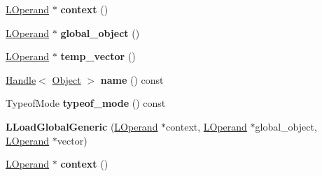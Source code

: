 \begin{DoxyCompactItemize}
\item 
\hyperlink{classv8_1_1internal_1_1_l_operand}{L\+Operand} $\ast$ {\bfseries context} ()\hypertarget{classv8_1_1internal_1_1_l_load_global_generic_acb9446dcc83f4319988b01ff0d957bf6}{}\label{classv8_1_1internal_1_1_l_load_global_generic_acb9446dcc83f4319988b01ff0d957bf6}

\item 
\hyperlink{classv8_1_1internal_1_1_l_operand}{L\+Operand} $\ast$ {\bfseries global\+\_\+object} ()\hypertarget{classv8_1_1internal_1_1_l_load_global_generic_a43bc76ffc93765b0231ba74a702acb19}{}\label{classv8_1_1internal_1_1_l_load_global_generic_a43bc76ffc93765b0231ba74a702acb19}

\item 
\hyperlink{classv8_1_1internal_1_1_l_operand}{L\+Operand} $\ast$ {\bfseries temp\+\_\+vector} ()\hypertarget{classv8_1_1internal_1_1_l_load_global_generic_a6e6428d159408fa7d9a31d38cc08919c}{}\label{classv8_1_1internal_1_1_l_load_global_generic_a6e6428d159408fa7d9a31d38cc08919c}

\item 
\hyperlink{classv8_1_1internal_1_1_handle}{Handle}$<$ \hyperlink{classv8_1_1internal_1_1_object}{Object} $>$ {\bfseries name} () const \hypertarget{classv8_1_1internal_1_1_l_load_global_generic_a8986cdf04702fb63aee12526199431ab}{}\label{classv8_1_1internal_1_1_l_load_global_generic_a8986cdf04702fb63aee12526199431ab}

\item 
Typeof\+Mode {\bfseries typeof\+\_\+mode} () const \hypertarget{classv8_1_1internal_1_1_l_load_global_generic_a92314902b26af0eba30f17b3c9e9d768}{}\label{classv8_1_1internal_1_1_l_load_global_generic_a92314902b26af0eba30f17b3c9e9d768}

\item 
{\bfseries L\+Load\+Global\+Generic} (\hyperlink{classv8_1_1internal_1_1_l_operand}{L\+Operand} $\ast$context, \hyperlink{classv8_1_1internal_1_1_l_operand}{L\+Operand} $\ast$global\+\_\+object, \hyperlink{classv8_1_1internal_1_1_l_operand}{L\+Operand} $\ast$vector)\hypertarget{classv8_1_1internal_1_1_l_load_global_generic_a5992cad6cdc59da767d3d35fdbf4c4f7}{}\label{classv8_1_1internal_1_1_l_load_global_generic_a5992cad6cdc59da767d3d35fdbf4c4f7}

\item 
\hyperlink{classv8_1_1internal_1_1_l_operand}{L\+Operand} $\ast$ {\bfseries context} ()\hypertarget{classv8_1_1internal_1_1_l_load_global_generic_acb9446dcc83f4319988b01ff0d957bf6}{}\label{classv8_1_1internal_1_1_l_load_global_generic_acb9446dcc83f4319988b01ff0d957bf6}


\end{DoxyCompactItemize}
